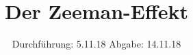

\subject{V 27}
\title{Der Zeeman-Effekt}
\date{
  Durchführung: 5.11.18
  \hspace{3em}
  Abgabe: 14.11.18
}



\maketitle
\thispagestyle{empty}
\tableofcontents
\newpage






\printbibliography




